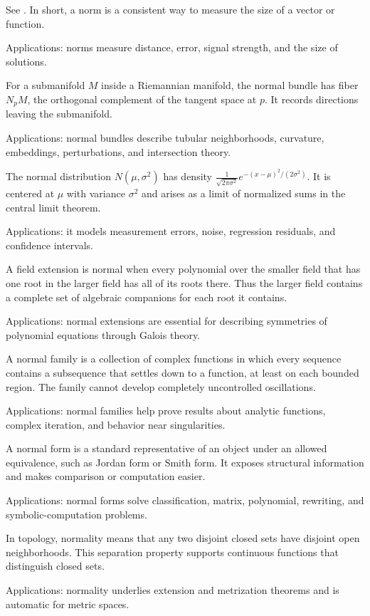 See . In short, a norm is a consistent way to measure the size of a vector or function. \par\noindent Applications: norms measure distance, error, signal strength, and the size of solutions.

For a submanifold $M$ inside a Riemannian manifold, the normal bundle has fiber $N_pM$, the orthogonal complement of the tangent space at $p$. It records directions leaving the submanifold. \par\noindent Applications: normal bundles describe tubular neighborhoods, curvature, embeddings, perturbations, and intersection theory.

The normal distribution $N(\mu,\sigma^2)$ has density $\frac1{\sqrt{2\pi\sigma^2}}e^{-(x-\mu)^2/(2\sigma^2)}$. It is centered at $\mu$ with variance $\sigma^2$ and arises as a limit of normalized sums in the central limit theorem. \par\noindent Applications: it models measurement errors, noise, regression residuals, and confidence intervals.

A field extension is normal when every polynomial over the smaller field that has one root in the larger field has all of its roots there. Thus the larger field contains a complete set of algebraic companions for each root it contains. \par\noindent Applications: normal extensions are essential for describing symmetries of polynomial equations through Galois theory.

A normal family is a collection of complex functions in which every sequence contains a subsequence that settles down to a function, at least on each bounded region. The family cannot develop completely uncontrolled oscillations. \par\noindent Applications: normal families help prove results about analytic functions, complex iteration, and behavior near singularities.

A normal form is a standard representative of an object under an allowed equivalence, such as Jordan form or Smith form. It exposes structural information and makes comparison or computation easier. \par\noindent Applications: normal forms solve classification, matrix, polynomial, rewriting, and symbolic-computation problems.

In topology, normality means that any two disjoint closed sets have disjoint open neighborhoods. This separation property supports continuous functions that distinguish closed sets. \par\noindent Applications: normality underlies extension and metrization theorems and is automatic for metric spaces.

